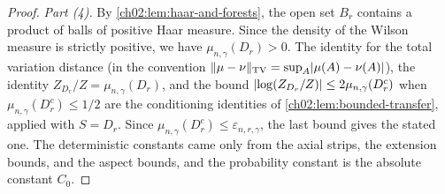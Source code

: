 \begin{proof}
\emph{Part (4).} By \cref{ch02:lem:haar-and-forests}, the open set $B_r$ contains a product of balls of positive Haar measure. Since the density of the Wilson measure is strictly positive, we have $\mu_{n,\gamma}(D_r)>0$. The identity for the total variation distance (in the convention $\lVert \mu-\nu\rVert_{\mathrm{TV}}=\sup_A\lvert \mu(A)-\nu(A)\rvert$), the identity $Z_{D_r}/Z=\mu_{n,\gamma}(D_r)$, and the bound $\lvert \log(Z_{D_r}/Z)\rvert\le2\mu_{n,\gamma}(D_r^c)$ when $\mu_{n,\gamma}(D_r^c)\le1/2$ are the conditioning identities of \cref{ch02:lem:bounded-transfer}, applied with $S=D_r$. Since $\mu_{n,\gamma}(D_r^c)\le\varepsilon_{n,r,\gamma}$, the last bound gives the stated one. The deterministic constants came only from the axial strips, the extension bounds, and the aspect bounds, and the probability constant is the absolute constant $C_0$.
\end{proof}
